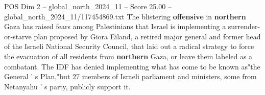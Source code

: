 \begin{textsample}{POS Dim 2 – global\_north\_2024\_11 – Score 25.00 – global\_north\_2024\_11/117454869.txt}
The blistering \textbf{offensive} in \textbf{northern} Gaza has raised fears among Palestinians that Israel is implementing a surrender-or-starve plan proposed by Giora Eiland, a retired major general and former head of the Israeli National Security Council, that laid out a radical strategy to force the evacuation of all residents from \textbf{northern} Gaza, or leave them labeled as a combatant.
The IDF has denied implementing what has come to be known as"the General ' s Plan,"but 27 members of Israeli parliament and ministers, some from Netanyahu ' s party, publicly support it.

\end{textsample}
